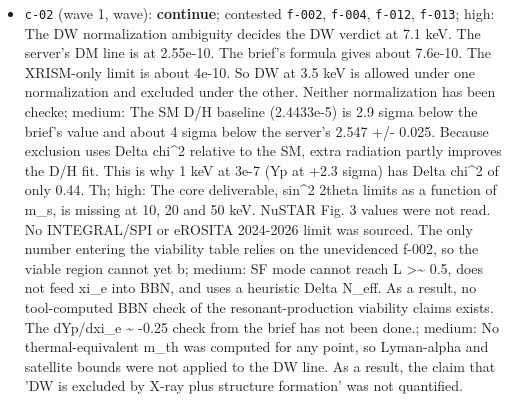 \documentclass[11pt,a4paper]{article}
\begin{document}
\begin{itemize}
  \item \texttt{c-02} (wave 1, wave): \textbf{continue}; contested \texttt{f-002}, \texttt{f-004}, \texttt{f-012}, \texttt{f-013}; high: The DW normalization ambiguity decides the DW verdict at 7.1 keV. The server's DM line is at 2.55e-10. The brief's formula gives about 7.6e-10. The XRISM-only limit is about 4e-10. So DW at 3.5 keV is allowed under one normalization and excluded under the other. Neither normalization has been checke; medium: The SM D/H baseline (2.4433e-5) is 2.9 sigma below the brief's value and about 4 sigma below the server's 2.547 +/- 0.025. Because exclusion uses Delta chi\textasciicircum{}2 relative to the SM, extra radiation partly improves the D/H fit. This is why 1 keV at 3e-7 (Yp at +2.3 sigma) has Delta chi\textasciicircum{}2 of only 0.44. Th; high: The core deliverable, sin\textasciicircum{}2 2theta limits as a function of m\_s, is missing at 10, 20 and 50 keV. NuSTAR Fig. 3 values were not read. No INTEGRAL/SPI or eROSITA 2024-2026 limit was sourced. The only number entering the viability table relies on the unevidenced f-002, so the viable region cannot yet b; medium: SF mode cannot reach L \textgreater{}\textasciitilde{} 0.5, does not feed xi\_e into BBN, and uses a heuristic Delta N\_eff. As a result, no tool-computed BBN check of the resonant-production viability claims exists. The dYp/dxi\_e \textasciitilde{} -0.25 check from the brief has not been done.; medium: No thermal-equivalent m\_th was computed for any point, so Lyman-alpha and satellite bounds were not applied to the DW line. As a result, the claim that 'DW is excluded by X-ray plus structure formation' was not quantified.

\end{itemize}
\end{document}
